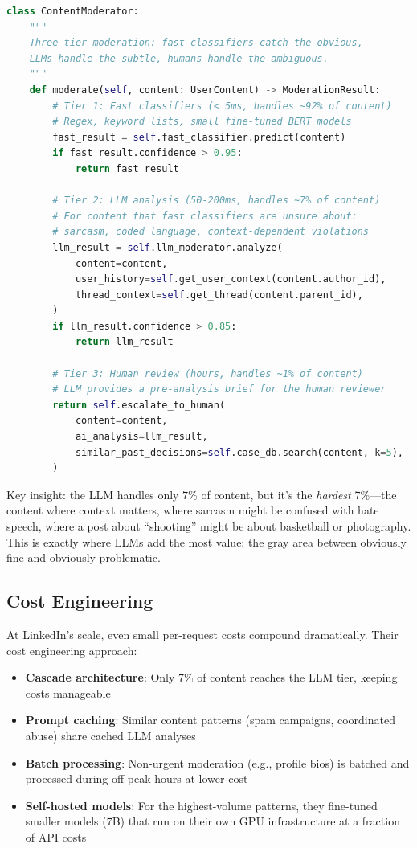 \begin{lstlisting}[language=Python, caption={LinkedIn's tiered moderation architecture}]
class ContentModerator:
    """
    Three-tier moderation: fast classifiers catch the obvious,
    LLMs handle the subtle, humans handle the ambiguous.
    """
    def moderate(self, content: UserContent) -> ModerationResult:
        # Tier 1: Fast classifiers (< 5ms, handles ~92% of content)
        # Regex, keyword lists, small fine-tuned BERT models
        fast_result = self.fast_classifier.predict(content)
        if fast_result.confidence > 0.95:
            return fast_result
        
        # Tier 2: LLM analysis (50-200ms, handles ~7% of content)
        # For content that fast classifiers are unsure about:
        # sarcasm, coded language, context-dependent violations
        llm_result = self.llm_moderator.analyze(
            content=content,
            user_history=self.get_user_context(content.author_id),
            thread_context=self.get_thread(content.parent_id),
        )
        if llm_result.confidence > 0.85:
            return llm_result
        
        # Tier 3: Human review (hours, handles ~1% of content)
        # LLM provides a pre-analysis brief for the human reviewer
        return self.escalate_to_human(
            content=content,
            ai_analysis=llm_result,
            similar_past_decisions=self.case_db.search(content, k=5),
        )
\end{lstlisting}

Key insight: the LLM handles only 7\% of content, but it's the \emph{hardest} 7\%---the content where context matters, where sarcasm might be confused with hate speech, where a post about ``shooting'' might be about basketball or photography. This is exactly where LLMs add the most value: the gray area between obviously fine and obviously problematic.

\subsection{Cost Engineering}

At LinkedIn's scale, even small per-request costs compound dramatically. Their cost engineering approach:

\begin{itemize}[leftmargin=*]
    \item \textbf{Cascade architecture}: Only 7\% of content reaches the LLM tier, keeping costs manageable
    \item \textbf{Prompt caching}: Similar content patterns (spam campaigns, coordinated abuse) share cached LLM analyses
    \item \textbf{Batch processing}: Non-urgent moderation (e.g., profile bios) is batched and processed during off-peak hours at lower cost
    \item \textbf{Self-hosted models}: For the highest-volume patterns, they fine-tuned smaller models (7B) that run on their own GPU infrastructure at a fraction of API costs
\end{itemize}


